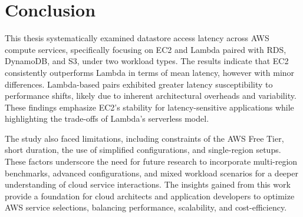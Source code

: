\section{Conclusion}
\label{cha:conclusion}

This thesis systematically examined datastore access latency across AWS compute services, specifically focusing on EC2 and Lambda paired with RDS, DynamoDB, and S3, under two workload types. The results indicate that EC2 consistently outperforms Lambda in terms of mean latency, however with minor differences. Lambda-based pairs exhibited greater latency susceptibility to performance shifts, likely due to inherent architectural overheads and variability. These findings emphasize EC2's stability for latency-sensitive applications while highlighting the trade-offs of Lambda's serverless model.

The study also faced limitations, including constraints of the AWS Free Tier, short duration, the use of simplified configurations, and single-region setups. These factors underscore the need for future research to incorporate multi-region benchmarks, advanced configurations, and mixed workload scenarios for a deeper understanding of cloud service interactions. The insights gained from this work provide a foundation for cloud architects and application developers to optimize AWS service selections, balancing performance, scalability, and cost-efficiency.

